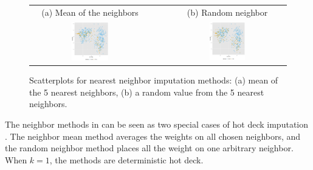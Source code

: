 \documentclass[article]{jss}
\begin{document}
\begin{center}
\begin{figure}[h]
\begin{centering}
\begin{tabular}{cccc}
{\tiny{(a) Mean of the neighbors}} &  &  & {\tiny{(b) Random neighbor}}\tabularnewline
\includegraphics[width=0.32\textwidth]{graph/fig3-5-knn} &  &  & \includegraphics[width=0.32\textwidth]{graph/fig3-5-knn-2}\tabularnewline
\end{tabular}
\par\end{centering}
\caption{Scatterplots for nearest neighbor imputation methods: (a) mean of the 5 nearest neighbors, (b) a random value from the 5 nearest neighbors.}
\label{fig:neighbor-imputation}
\end{figure}
\par\end{center}



The neighbor methods in  can be seen as two special cases of hot deck imputation \citep{andridge2010review}. The neighbor mean method averages the weights on all chosen neighbors, and the random neighbor method places all the weight on one arbitrary neighbor. When $k=1$, the methods are deterministic hot deck.
\end{document}
